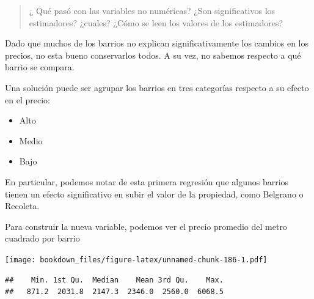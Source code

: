 \documentclass[]{book}
\newenvironment{Shaded}{\begin{snugshade}}{\end{snugshade}}
\newcommand{\DataTypeTok}[1]{\textcolor[rgb]{0.13,0.29,0.53}{#1}}
\newcommand{\KeywordTok}[1]{\textcolor[rgb]{0.13,0.29,0.53}{\textbf{#1}}}
\newcommand{\NormalTok}[1]{#1}
\newcommand{\OperatorTok}[1]{\textcolor[rgb]{0.81,0.36,0.00}{\textbf{#1}}}
\newcommand{\StringTok}[1]{\textcolor[rgb]{0.31,0.60,0.02}{#1}}
\providecommand{\tightlist}{%
  \setlength{\itemsep}{0pt}\setlength{\parskip}{0pt}}
\begin{document}
\begin{quote}
¿ Qué pasó con las variables no numéricas?
¿Son significativos los estimadores? ¿cuales?
¿Cómo se leen los valores de los estimadores?
\end{quote}

Dado que muchos de los barrios no explican significativamente los cambios en los precios, no esta bueno conservarlos todos. A su vez, no sabemos respecto a qué barrio se compara.

Una solución puede ser agrupar los barrios en tres categorías respecto a su efecto en el precio:

\begin{itemize}
\tightlist
\item
  Alto
\item
  Medio
\item
  Bajo
\end{itemize}

En particular, podemos notar de esta primera regresión que algunos barrios tienen un efecto significativo en subir el valor de la propiedad, como Belgrano o Recoleta.

Para construir la nueva variable, podemos ver el precio promedio del metro cuadrado por barrio

\begin{Shaded}
\end{Shaded}

\texttt{[image: bookdown\_files/figure-latex/unnamed-chunk-186-1.pdf]}

\begin{Shaded}
\end{Shaded}

\begin{verbatim}
##    Min. 1st Qu.  Median    Mean 3rd Qu.    Max. 
##   871.2  2031.8  2147.3  2346.0  2560.0  6068.5
\end{verbatim}
\end{document}
